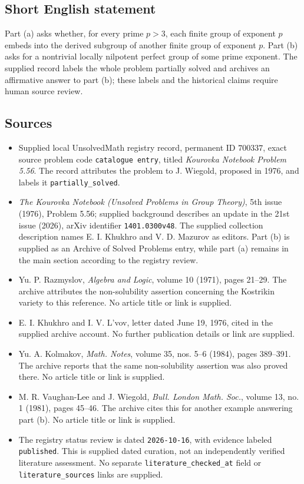 \documentclass[11pt]{article}
\begin{document}
\subsection{Short English statement}
Part (a) asks whether, for every prime \(p>3\), each finite group of exponent \(p\) embeds into the derived subgroup of another finite group of exponent \(p\). Part (b) asks for a nontrivial locally nilpotent perfect group of some prime exponent. The supplied record labels the whole problem partially solved and archives an affirmative answer to part (b); these labels and the historical claims require human source review.
\subsection{Sources}
\begin{itemize}
\item Supplied local UnsolvedMath registry record, permanent ID \(700337\), exact source problem code \texttt{catalogue entry}, titled \emph{Kourovka Notebook Problem 5.56}. The record attributes the problem to J. Wiegold, proposed in 1976, and labels it \texttt{partially\_solved}.
\item \emph{The Kourovka Notebook (Unsolved Problems in Group Theory)}, 5th issue (1976), Problem 5.56; supplied background describes an update in the 21st issue (2026), arXiv identifier \texttt{1401.0300v48}. The supplied collection description names E. I. Khukhro and V. D. Mazurov as editors. Part (b) is supplied as an Archive of Solved Problems entry, while part (a) remains in the main section according to the registry review.
\item Yu. P. Razmyslov, \emph{Algebra and Logic}, volume 10 (1971), pages 21--29. The archive attributes the non-solubility assertion concerning the Kostrikin variety to this reference. No article title or link is supplied.
\item E. I. Khukhro and I. V. L'vov, letter dated June 19, 1976, cited in the supplied archive account. No further publication details or link are supplied.
\item Yu. A. Kolmakov, \emph{Math. Notes}, volume 35, nos. 5--6 (1984), pages 389--391. The archive reports that the same non-solubility assertion was also proved there. No article title or link is supplied.
\item M. R. Vaughan-Lee and J. Wiegold, \emph{Bull. London Math. Soc.}, volume 13, no. 1 (1981), pages 45--46. The archive cites this for another example answering part (b). No article title or link is supplied.
\item The registry status review is dated \texttt{2026-10-16}, with evidence labeled \texttt{published}. This is supplied dated curation, not an independently verified literature assessment. No separate \texttt{literature\_checked\_at} field or \texttt{literature\_sources} links are supplied.
\end{itemize}
\end{document}
